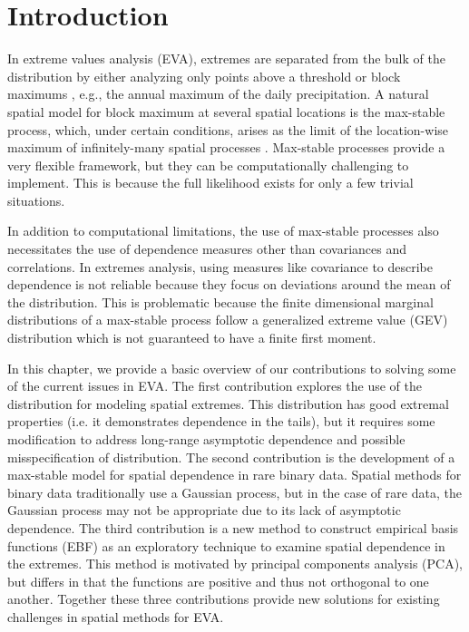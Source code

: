 \chapter{Introduction}
\label{chap:one}

In extreme values analysis (EVA), extremes are separated from the bulk of the distribution by either analyzing only points above a threshold or block maximums \citep{Coles2001}, e.g., the annual maximum of the daily precipitation.
A natural spatial model for block maximum at several spatial locations is the max-stable process, which, under certain conditions, arises as the limit of the location-wise maximum of infinitely-many spatial processes \citep{deHaan2006}.
Max-stable processes provide a very flexible framework, but they can be computationally challenging to implement.
This is because the full likelihood exists for only a few trivial situations.

In addition to computational limitations, the use of max-stable processes also necessitates the use of dependence measures other than covariances and correlations.
In extremes analysis, using measures like covariance to describe dependence is not reliable because they focus on deviations around the mean of the distribution.
This is problematic because the finite dimensional marginal distributions of a max-stable process follow a generalized extreme value (GEV) distribution which is not guaranteed to have a finite first moment.

In this chapter, we provide a basic overview of our contributions to solving some of the current issues in EVA.
The first contribution explores the use of the \skewt{} distribution for modeling spatial extremes.
This distribution has good extremal properties (i.e. it demonstrates dependence in the tails), but it requires some modification to address long-range asymptotic dependence and possible misspecification of distribution.
The second contribution is the development of a max-stable model for spatial dependence in rare binary data.
Spatial methods for binary data traditionally use a Gaussian process, but in the case of rare data, the Gaussian process may not be appropriate due to its lack of asymptotic dependence.
The third contribution is a new method to construct empirical basis functions (EBF) as an exploratory technique to examine spatial dependence in the extremes.
This method is motivated by principal components analysis (PCA), but differs in that the functions are positive and thus not orthogonal to one another.
Together these three contributions provide new solutions for existing challenges in spatial methods for EVA.

